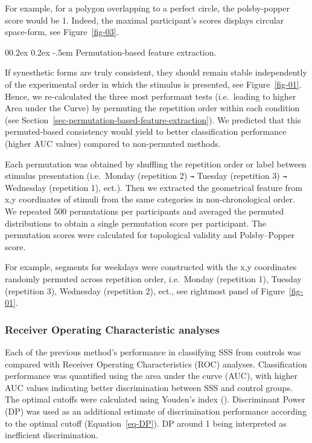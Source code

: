 \documentclass[
  man,
  floatsintext,
  longtable,
  a4paper,
  nolmodern,
  notxfonts,
  notimes,
  colorlinks=true,linkcolor=blue,citecolor=blue,urlcolor=blue]{apa7}
\makeatletter
\renewcommand{\paragraph}{\@startsection{paragraph}{4}{\parindent}%
	{0\baselineskip \@plus 0.2ex \@minus 0.2ex}%
	{-.5em}%
	{\normalfont\normalsize\bfseries\typesectitle}}
\makeatother
\begin{document}
For example, for a polygon overlapping to a perfect circle, the
polsby-popper score would be 1. Indeed, the maximal participant's scores
displays circular space-form, see Figure~\ref{fig-03}.

\paragraph{Permutation-based feature
extraction.}\label{sec-permutation-based-feature-extraction}

If synesthetic forms are truly consistent, they should remain stable
independently of the experimental order in which the stimulus is
presented, see Figure~\ref{fig-01}. Hence, we re-calculated the three
most performant tests (i.e.~leading to higher Area under the Curve) by
permuting the repetition order within each condition (see
Section~\ref{sec-permutation-based-feature-extraction}). We predicted
that this permuted-based consistency would yield to better
classification performance (higher AUC values) compared to non-permuted
methods.

Each permutation was obtained by shuffling the repetition order or label
between stimulus presentation (i.e.~Monday (repetition 2) \texttt{→}
Tuesday (repetition 3) \texttt{→} Wednesday (repetition 1), ect.). Then
we extracted the geometrical feature from x,y coordinates of stimuli
from the same categories in non-chronological order. We repeated 500
permutations per participants and averaged the permuted distributions to
obtain a single permutation score per participant. The permutation
scores were calculated for topological validity and Polsby--Popper
score.

For example, segments for weekdays were constructed with the x,y
coordinates randomly permuted across repetition order, i.e.~Monday
(repetition 1), Tuesday (repetition 3), Wednesday (repetition 2), ect.,
see rightmost panel of Figure~\ref{fig-01}.

\subsubsection{Receiver Operating Characteristic
analyses}\label{sec-receiver-operating-characteristic-analyses}

Each of the previous method's performance in classifying SSS from
controls was compared with Receiver Operating Characteristics (ROC)
analyses. Classification performance was quantified using the area under
the curve (AUC), with higher AUC values indicating better discrimination
between SSS and control groups. The optimal cutoffs were calculated
using Youden's index ().
Discriminant Power (DP) was used as an additional estimate of
discrimination performance according to the optimal cutoff
(Equation~\ref{eq-DP}). DP around 1 being interpreted as inefficient
discrimination.
\end{document}
